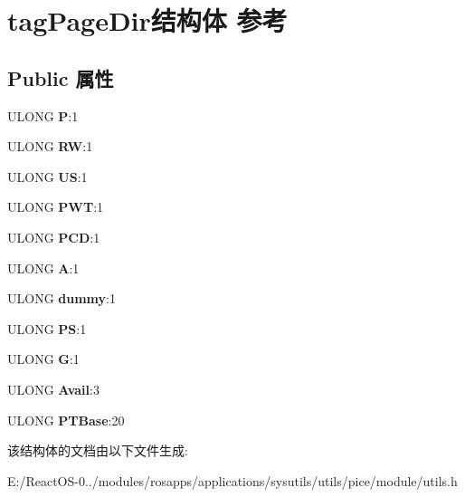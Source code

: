 \hypertarget{structtag_page_dir}{}\section{tag\+Page\+Dir结构体 参考}
\label{structtag_page_dir}
\subsection*{Public 属性}
\begin{DoxyCompactItemize}
\item 
\mbox{\label{structtag_page_dir_a40145b909d2209669ace0668c7cc2f2c}} 
U\+L\+O\+NG {\bfseries P}\+:1
\item 
\mbox{\label{structtag_page_dir_adbabd971f09fc485217011e32dc7476d}} 
U\+L\+O\+NG {\bfseries RW}\+:1
\item 
\mbox{\label{structtag_page_dir_acb5a3cd3b6266f47d189443bcfc48c83}} 
U\+L\+O\+NG {\bfseries US}\+:1
\item 
\mbox{\label{structtag_page_dir_a71c3c3f6934e8e576c935a7ff24f9c51}} 
U\+L\+O\+NG {\bfseries P\+WT}\+:1
\item 
\mbox{\label{structtag_page_dir_a08bf1ac39391382ceebe0ac87850fffb}} 
U\+L\+O\+NG {\bfseries P\+CD}\+:1
\item 
\mbox{\label{structtag_page_dir_a7c3170c5a49bb0e739a96e709b82312d}} 
U\+L\+O\+NG {\bfseries A}\+:1
\item 
\mbox{\label{structtag_page_dir_a2b17d14a485849b07a5c5f530acef45b}} 
U\+L\+O\+NG {\bfseries dummy}\+:1
\item 
\mbox{\label{structtag_page_dir_a622d2593376670c1b4f866b87e7b2d53}} 
U\+L\+O\+NG {\bfseries PS}\+:1
\item 
\mbox{\label{structtag_page_dir_a4d44bfa03a74122b9f00cd1610e90070}} 
U\+L\+O\+NG {\bfseries G}\+:1
\item 
\mbox{\label{structtag_page_dir_ad3678ef63f6fd66c9ae78abb5d84ef35}} 
U\+L\+O\+NG {\bfseries Avail}\+:3
\item 
\mbox{\label{structtag_page_dir_a3f278de6a6e2698e4a834ba114904773}} 
U\+L\+O\+NG {\bfseries P\+T\+Base}\+:20
\end{DoxyCompactItemize}


该结构体的文档由以下文件生成\+:\begin{DoxyCompactItemize}
\item 
E\+:/\+React\+O\+S-\/0../modules/rosapps/applications/sysutils/utils/pice/module/utils.\+h\end{DoxyCompactItemize}
